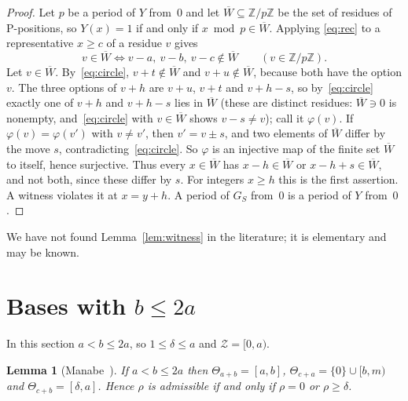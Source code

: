 \documentclass[11pt]{amsart}
\newtheorem{lemma}[theorem]{Lemma}
\theoremstyle{definition}
\numberwithin{equation}{section}
\newcommand{\Z}{\mathcal{Z}}
\newcommand{\Th}[1]{\Theta_{#1}}
\begin{document}
\begin{proof}
Let $p$ be a period of $Y$ from~$0$ and let $\overline W\subseteq\mathbb{Z}/p\mathbb{Z}$ be the
set of residues of P-positions, so $Y(x)=1$ if and only if $x\bmod p\in\overline W$. Applying
\eqref{eq:rec} to a representative $x\ge c$ of a residue $v$ gives
\begin{equation}\label{eq:circle}
v\in\overline W\iff v-a,\ v-b,\ v-c\notin\overline W\qquad(v\in\mathbb{Z}/p\mathbb{Z}).
\end{equation}
Let $v\in\overline W$. By~\eqref{eq:circle}, $v+t\notin\overline W$ and $v+u\notin\overline W$,
because both have the option $v$. The three options of $v+h$ are $v+u$, $v+t$ and $v+h-s$,
so by~\eqref{eq:circle} exactly one of $v+h$ and $v+h-s$ lies in $\overline W$ (these are
distinct residues: $\overline W\ni0$ is nonempty, and~\eqref{eq:circle} with $v\in\overline W$
shows $v-s\ne v$); call it
$\varphi(v)$. If $\varphi(v)=\varphi(v')$ with $v\ne v'$, then $v'=v\pm s$, and two elements
of $\overline W$ differ by the move $s$, contradicting~\eqref{eq:circle}. So $\varphi$ is an
injective map of the finite set $\overline W$ to itself, hence surjective. Thus every
$x\in\overline W$ has $x-h\in\overline W$ or $x-h+s\in\overline W$, and not both, since these
differ by $s$. For integers $x\ge h$ this is the first assertion. A witness violates it at
$x=y+h$. A period of $G_S$ from~$0$ is a period of $Y$ from~$0$.
\end{proof}

We have not found Lemma~\ref{lem:witness} in the literature; it is elementary and may be
known.

\section{Bases with \texorpdfstring{$b\le 2a$}{b <= 2a}}

In this section $a<b\le 2a$, so $1\le\delta\le a$ and $\Z=[0,a)$.

\begin{lemma}[{Manabe~\cite[Lemma~14, Prop.~26, \S6]{Manabe}}]\label{lem:angles}
If $a<b\le 2a$ then $\Th{a+b}=[a,b]$, $\Th{c+a}=\{0\}\cup[b,m)$ and $\Th{c+b}=[\delta,a]$.
Hence $\rho$ is admissible if and only if $\rho=0$ or $\rho\ge\delta$.
\end{lemma}
\end{document}
